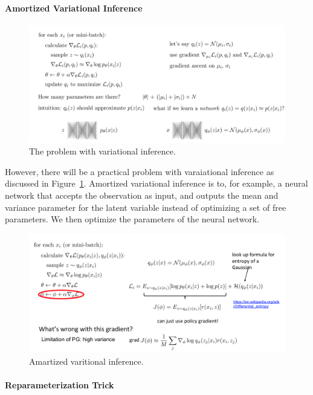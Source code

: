 \documentclass{article}
\begin{document}
\paragraph{Amortized Variational Inference}
\begin{figure}[h]
    \centering
	\includegraphics[width=\textwidth]{fig/vi_problem.png}
	\caption{The problem with variational inference.}
	\label{fig:problem}
\end{figure}
However, there will be a practical problem with varaiational inference as discussed in Figure~\ref{fig:problem}. Amortized variational inference is to, for example, a neural network that accepts the observation as input, and outputs the mean and variance parameter for the latent variable instead of optimizing a set of free parameters. We  then optimize the parameters of the neural network.
\begin{figure}[h]
    \centering
	\includegraphics[width=\textwidth]{fig/amortized.png}
	\caption{Amartized varitional inference.}
	\label{fig:avi}
\end{figure}


\paragraph{Reparameterization Trick}
\end{document}
